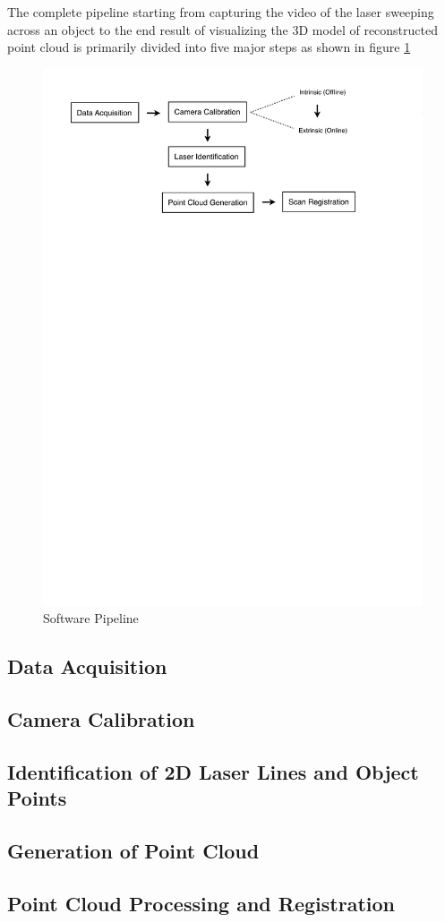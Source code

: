 The complete pipeline starting from capturing the video of the laser sweeping across an object to the end result of visualizing the 3D model of reconstructed point cloud is primarily divided into five major steps as shown in figure \ref{figure:pipeline}

\begin{figure}[ht!]
\centering
\includegraphics[width=0.8\linewidth]{figures/pipeline}
\caption{Software Pipeline}
\label{figure:pipeline}
\end{figure}

\subsection{Data Acquisition}
\label{subsection:data-acquistion}


\subsection{Camera Calibration}
\label{subsection:camera-calibration}


\subsection{Identification of 2D Laser Lines and Object Points}
\label{subsection:search-laser}


\subsection{Generation of Point Cloud}
\label{subsection:generate-pointcloud}


\subsection{Point Cloud Processing and Registration}
\label{subsection:registration}

